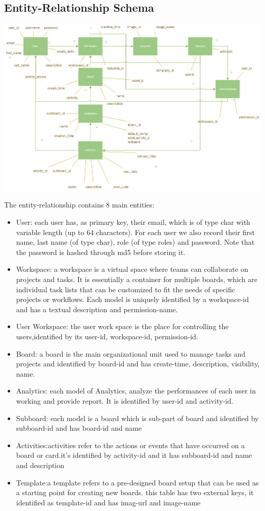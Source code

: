 \subsection{Entity-Relationship Schema}

\includegraphics[width=\columnwidth]{images/ER-schma.jpg}

\noindent The entity-relationship contains 8 main entities:
\begin{itemize}
    \item User: each user has, as primary key, their email, which is of type char with variable length (up to 64 characters). For each user we also record their first name, last name (of type char), role (of type roles) and password. Note that the password is hashed through md5 before storing it.
    \item Workspace: a workspace is a virtual space where teams can collaborate on projects and tasks. It is essentially a container for multiple boards, which are individual task lists that can be customized to fit the needs of specific projects or workflows. Each model is uniquely identified by a workspace-id and has a textual description and permission-name.
    \item User Workspace: the user work space is the place for controlling the users,identified by its user-id, workspace-id, permission-id.
    \item Board: a board is the main organizational unit used to manage tasks and projects and identified by board-id and has create-time, description, visibility, name.
    \item Analytics: each model of Analytics, analyze the performances of each user in working and provide report. It is identified by user-id and activity-id.
    \item Subboard: each model is a board which is sub-part of board and identified by subboard-id and has board-id and name 
    \item Activities:activities refer to the actions or events that have occurred on a board or card.it's identified by activity-id and it has subboard-id and name and description
    \item Template:a template refers to a pre-designed board setup that can be used as a starting point for creating new boards. this table has two external keys, it identified as template-id and has imag-url and image-name
\end{itemize}
